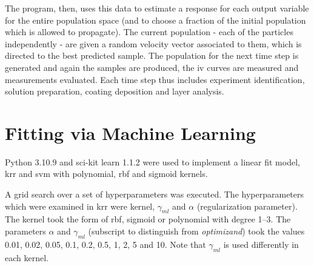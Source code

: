 The program, then, uses this data to estimate a response for each output variable 
for the entire population space
(and to choose a fraction of the initial population which is allowed to propagate).
The current population - each of the particles independently - 
are given a random velocity vector associated to them, which is directed to the best predicted sample. 
The population for the next time step is generated and 
again the samples are produced, the \gls{iv} curves are measured and measurements evaluated.
Each time step thus includes experiment identification, solution preparation, coating deposition and layer analysis. 


\section{Fitting via Machine Learning}
Python 3.10.9 and sci-kit learn 1.1.2\cite{pedregosa2011scikit} were used to implement a linear fit model, \gls{krr} and \gls{svm} with polynomial, \gls{rbf} and sigmoid kernels. 

A grid search over a set of hyperparameters was executed. 
The hyperparameters which were examined in \gls{krr} were kernel, $\gamma_{ml}$  and $\alpha$ (regularization parameter).
The kernel took the form of \gls{rbf}, sigmoid or polynomial with degree 1--3.
The parameters $\alpha$ and $\gamma_{ml}$ (subscript to distinguish from \textit{optimizand}) took the values 0.01, 0.02, 0.05, 0.1, 0.2, 0.5, 1, 2, 5 and 10.
Note that $\gamma_{ml}$ is used differently in each kernel. 

